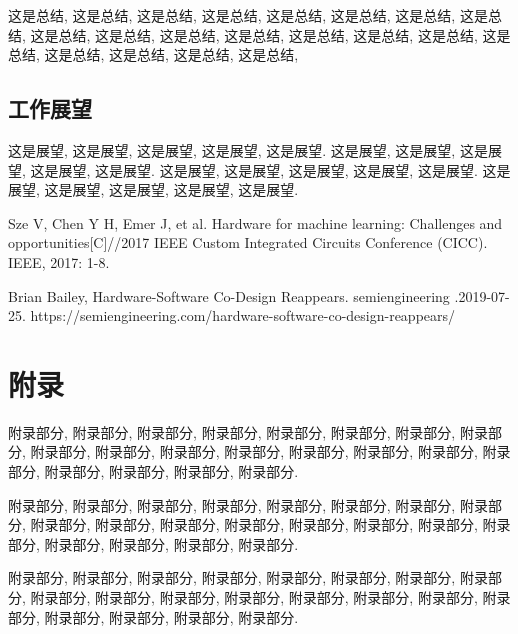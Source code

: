 \documentclass[UTF8,openright]{ctexbook}
\begin{document}
这是总结, 这是总结, 这是总结, 这是总结, 这是总结, 
这是总结, 这是总结, 这是总结, 这是总结, 这是总结, 
这是总结, 这是总结, 这是总结, 这是总结, 这是总结, 
这是总结, 这是总结, 这是总结, 这是总结, 这是总结, 

\newpage
\section {工作展望}

这是展望, 这是展望, 这是展望, 这是展望, 这是展望.
这是展望, 这是展望, 这是展望, 这是展望, 这是展望.
这是展望, 这是展望, 这是展望, 这是展望, 这是展望.
这是展望, 这是展望, 这是展望, 这是展望, 这是展望.

\clearpage%
\backmatter
\linespread{1.6}\selectfont
\setlength{\bibsep}{1ex}  %
\begin{thebibliography}{99}
\thispagestyle{fancy}



Sze V, Chen Y H, Emer J, et al. Hardware for machine learning: Challenges and opportunities[C]//2017 IEEE Custom Integrated Circuits Conference (CICC). IEEE, 2017: 1-8.

Brian Bailey, Hardware-Software Co-Design Reappears. semiengineering .2019-07-25. https://semiengineering.com/hardware-software-co-design-reappears/
 



\end{thebibliography}


\clearpage{\pagestyle{fancy}\cleardoublepage}
\chapter*{附录}
附录部分, 附录部分, 附录部分, 附录部分, 附录部分,
附录部分, 附录部分, 附录部分, 附录部分, 附录部分,
附录部分, 附录部分, 附录部分, 附录部分, 附录部分,
附录部分, 附录部分, 附录部分, 附录部分, 附录部分.

附录部分, 附录部分, 附录部分, 附录部分, 附录部分,
附录部分, 附录部分, 附录部分, 附录部分, 附录部分,
附录部分, 附录部分, 附录部分, 附录部分, 附录部分,
附录部分, 附录部分, 附录部分, 附录部分, 附录部分.

\newpage 

附录部分, 附录部分, 附录部分, 附录部分, 附录部分,
附录部分, 附录部分, 附录部分, 附录部分, 附录部分,
附录部分, 附录部分, 附录部分, 附录部分, 附录部分,
附录部分, 附录部分, 附录部分, 附录部分, 附录部分.
\end{document}
